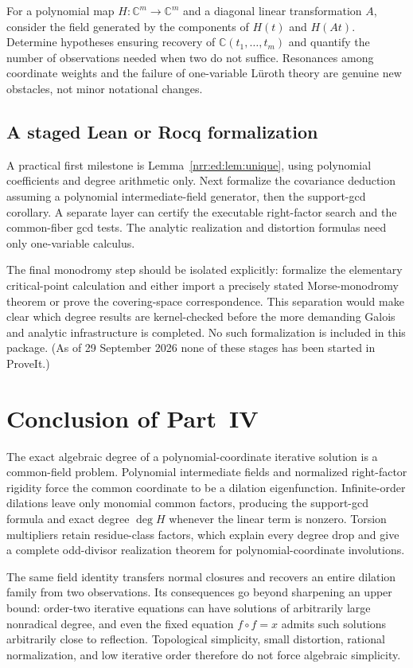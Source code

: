 \documentclass[11pt,letterpaper]{article}
\theoremstyle{definition}
\theoremstyle{remark}
\newcommand{\C}{\mathbb C}
\begin{document}
For a polynomial map $H:\C^m\to\C^m$ and a diagonal linear transformation $A$,
consider the field generated by the components of $H(t)$ and $H(At)$. Determine
hypotheses ensuring recovery of $\C(t_1,\ldots,t_m)$ and quantify the number of
observations needed when two do not suffice. Resonances among coordinate weights
and the failure of one-variable L\"uroth theory are genuine new obstacles, not
minor notational changes.

\subsection{A staged Lean or Rocq formalization}

A practical first milestone is Lemma~\ref{nrr:ed:lem:unique}, using polynomial coefficients
and degree arithmetic only. Next formalize the covariance deduction assuming a
polynomial intermediate-field generator, then the support-gcd corollary. A separate
layer can certify the executable right-factor search and the common-fiber gcd tests.
The analytic realization and distortion formulas need only one-variable calculus.

The final monodromy step should be isolated explicitly: formalize the elementary
critical-point calculation and either import a precisely stated Morse-monodromy
theorem or prove the covering-space correspondence. This separation would make
clear which degree results are kernel-checked before the more demanding Galois
and analytic infrastructure is completed. No such formalization is included in
this package. (As of 29 September 2026 none of these stages has been started
in ProveIt.)

\section{Conclusion of Part~IV}
\label{nrr:ed:sec:conclusion}

The exact algebraic degree of a polynomial-coordinate iterative solution is a
common-field problem. Polynomial intermediate fields and normalized right-factor
rigidity force the common coordinate to be a dilation eigenfunction. Infinite-order
dilations leave only monomial common factors, producing the support-gcd formula
and exact degree $\deg H$ whenever the linear term is nonzero. Torsion multipliers
retain residue-class factors, which explain every degree drop and give a complete
odd-divisor realization theorem for polynomial-coordinate involutions.

The same field identity transfers normal closures and recovers an entire dilation
family from two observations. Its consequences go beyond sharpening an upper
bound: order-two iterative equations can have solutions of arbitrarily large
nonradical degree, and even the fixed equation $f\circ f=x$ admits such solutions
arbitrarily close to reflection. Topological simplicity, small distortion, rational
normalization, and low iterative order therefore do not force algebraic simplicity.
\end{document}
